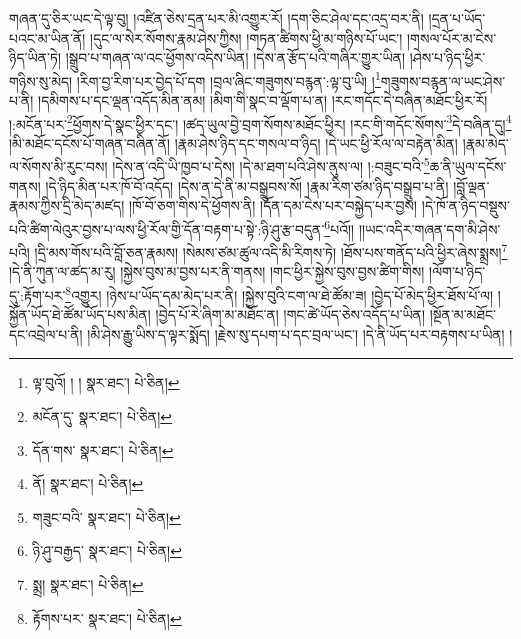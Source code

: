 གཞན་དུ་ཅིར་ཡང་དེ་ལྟ་བུ། །འཛིན་ཅེས་དྲན་པར་མི་འགྱུར་རོ། །དག་ཅིང་ཤེལ་དང་འདྲ་བར་ནི། །དྲན་པ་ཡོད་པའང་མ་ཡིན་ནོ། །དུང་ལ་སེར་སོགས་རྣམ་ཤེས་ཀྱིས། །གཏན་ཚིགས་ཕྱི་མ་གཉིས་པོ་ཡང་། །གསལ་པོར་མ་ངེས་ཉིད་ཡིན་ཏེ། །སྒྲུབ་པ་གཞན་ལ་འང་ཕྱོགས་འདིས་ཡིན། །དེས་ན་རྩོད་པའི་གཞིར་གྱུར་ཡིན། །ཤེས་པ་ཉིད་ཕྱིར་གཉིས་སུ་མེད། །རིག་བྱ་རིག་པར་བྱེད་པོ་དག །བྲལ་ཞིང་གཟུགས་བརྙན་:ལྟ་བུ་ཡི། །\footnote{ལྟ་བུའོ། ། །  སྣར་ཐང་།  པེ་ཅིན། }གཟུགས་བརྙན་ལ་ཡང་ཤེས་པ་ནི། །དམིགས་པ་དང་ལྡན་འདོད་མིན་ནམ། །མིག་གི་སྣང་བ་ལྡོག་པ་ན། །རང་གདོང་དེ་བཞིན་མཐོང་ཕྱིར་རོ། །:མངོན་པར་\footnote{མངོན་དུ་  སྣར་ཐང་།  པེ་ཅིན། }ཕྱོགས་དེ་སྣང་ཕྱིར་དང་། །ཚད་ཡུལ་བྱེ་བྲག་སོགས་མཐོང་ཕྱིར། །རང་གི་གདོང་སོགས་\footnote{དོན་གས་  སྣར་ཐང་།  པེ་ཅིན། }དེ་བཞིན་དུ།\footnote{ནོ།  སྣར་ཐང་།  པེ་ཅིན། } །མི་མཐོང་དངོས་པོ་གཞན་བཞིན་ནོ། །རྣམ་ཤེས་ཉིད་དང་གསལ་བ་ཉིད། །དེ་ཡང་ཕྱི་རོལ་ལ་བརྟེན་མིན། །རྣམ་མེད་ལ་སོགས་མི་རུང་བས། །དེས་ན་འདི་ཡི་ཁྱབ་པ་དེས། །དེ་མ་ཐག་པའི་ཤེས་ནུས་ལ། །:བཟུང་བའི་\footnote{གཟུང་བའི་  སྣར་ཐང་།  པེ་ཅིན། }ཆ་ནི་ཡུལ་དངོས་གནས། །དེ་ཉིད་མིན་པར་ཁོ་བོ་འདོད། །དེས་ན་དེ་ནི་མ་བསྒྲུབས་སོ། །རྣམ་རིག་ཙམ་ཉིད་བསྒྲུབ་པ་ནི། །བློ་ལྡན་རྣམས་ཀྱིས་དྲི་མེད་མཛད། །ཁོ་བོ་ཅག་གིས་དེ་ཕྱོགས་ནི། །དོན་དམ་ངེས་པར་བསྐྱེད་པར་བྱས། །དེ་ཁོ་ན་ཉིད་བསྡུས་པའི་ཚིག་ལེའུར་བྱས་པ་ལས་ཕྱི་རོལ་གྱི་དོན་བརྟག་པ་སྟེ་:ཉི་ཤུ་རྩ་བདུན་\footnote{ཉི་ཤུ་བརྒྱད་  སྣར་ཐང་།  པེ་ཅིན། }པའོ།། །།ཡང་འདིར་གཞན་དག་མི་ཤེས་པའི། །དྲི་མས་གོས་པའི་བློ་ཅན་རྣམས། །སེམས་ཙམ་ཚུལ་འདི་མི་རིགས་ཏེ། །ཐོས་པས་གནོད་པའི་ཕྱིར་ཞེས་སྨྲས།\footnote{སྨྲ།  སྣར་ཐང་།  པེ་ཅིན། } །དེ་ནི་ཀུན་ལ་ཚད་མ་རུ། །སྐྱེས་བུས་མ་བྱས་པར་ནི་གནས། །གང་ཕྱིར་སྐྱེས་བུས་བྱས་ཚིག་གིས། །ལོག་པ་ཉིད་དུ་:རྟོག་པར་\footnote{རྟོགས་པར་  སྣར་ཐང་།  པེ་ཅིན། }འགྱུར། །ཉེས་པ་ཡོད་དམ་མེད་པར་ནི། །སྐྱེས་བུའི་ངག་ལ་ཐེ་ཚོམ་ཟ། །བྱེད་པོ་མེད་ཕྱིར་ཐོས་པོ་ལ། །སྐྱོན་ཡོད་ཐེ་ཚོམ་ཡོད་པས་མིན། །བྱེད་པོ་རེ་ཞིག་མ་མཐོང་ན། །གང་ཚེ་ཡོད་ཅེས་འདོད་པ་ཡིན། །སྔོན་མ་མཐོང་དང་འབྲེལ་པ་ནི། །མི་ཤེས་རྒྱུ་ཡིས་ད་ལྟར་སྨོད། །རྗེས་སུ་དཔག་པ་དང་བྲལ་ཡང་། །དེ་ནི་ཡོད་པར་བརྟགས་པ་ཡིན། །
